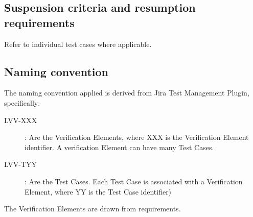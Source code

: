 \documentclass[DM,lsstdraft,STS,toc]{lsstdoc}
\begin{document}
\subsection{Suspension criteria and resumption requirements}
\label{suspension}

Refer to individual test cases where applicable.

\subsection{Naming convention}

The naming convention applied is derived from Jira Test Management Plugin, specifically: 
\begin{description}

  \item[LVV-XXX]{: Are the Verification Elements, where XXX is the Verification Element identifier. A verification Element can have many Test Cases. }
  \item[LVV-TYY]{: Are the Test Cases. Each Test Case is associated with a Verification Element, where YY is the Test Case identifier)}

\end{description}

The Verification Elements are drawn from  requirements.  
\newpage

\end{document}
